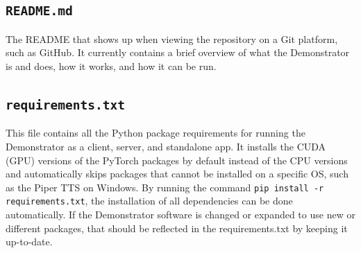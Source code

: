 \subsection{\texttt{README.md}}
The README that shows up when viewing the repository on a Git platform, such as GitHub.
It currently contains a brief overview of what the Demonstrator is and does, how it works, and how it can be run.

\subsection{\texttt{requirements.txt}}
This file contains all the Python package requirements for running the Demonstrator as a client, server, and standalone app.
It installs the CUDA (GPU) versions of the PyTorch packages by default instead of the CPU versions and automatically skips packages that cannot be installed on a specific OS, such as the Piper TTS on Windows.
By running the command \texttt{pip install -r requirements.txt}, the installation of all dependencies can be done automatically.
If the Demonstrator software is changed or expanded to use new or different packages, that should be reflected in the requirements.txt by keeping it up-to-date.

